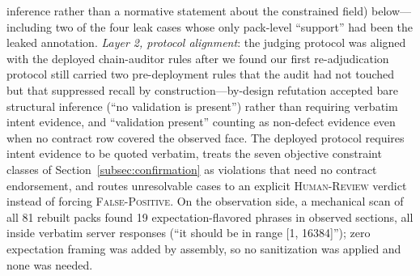 \documentclass[acmsmall,screen,review,anonymous]{acmart}
\begin{document}
inference rather than a normative statement about the constrained field) below---including two of the four leak cases whose only pack-level ``support'' had been the leaked annotation. \emph{Layer 2, protocol alignment}: the judging protocol was aligned with the deployed chain-auditor rules after we found our first re-adjudication protocol still carried two pre-deployment rules that the audit had not touched but that suppressed recall by construction---by-design refutation accepted bare structural inference (``no validation is present'') rather than requiring verbatim intent evidence, and ``validation present'' counting as non-defect evidence even when no contract row covered the observed face. The deployed protocol requires intent evidence to be quoted verbatim, treats the seven objective constraint classes of Section~\ref{subsec:confirmation} as violations that need no contract endorsement, and routes unresolvable cases to an explicit \textsc{Human-Review} verdict instead of forcing \textsc{False-Positive}. On the observation side, a mechanical scan of all 81 rebuilt packs found 19 expectation-flavored phrases in observed sections, all inside verbatim server responses (``it should be in range [1, 16384]''); zero expectation framing was added by assembly, so no sanitization was applied and none was needed.
\end{document}
